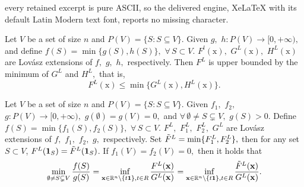 \documentclass[10pt,a4paper]{amsart}
\providecommand{\vx}{\ensuremath{\vec{x}}}
\renewcommand{\vec}[1]{\boldsymbol{\mathrm{#1}}}
\begin{document}
every retained excerpt is pure ASCII, so the delivered engine, XeLaTeX with its default Latin Modern text font, reports no missing character.
\begin{lemma}
\label{lem:min Lovasz}
Let $V$ be a set of size $n$ and $P(V) = \{S : S \subseteq V\}.$ Given $g,$ $h: P(V) \rightarrow [0, +\infty),$ and define $f(S) = \min\{g(S), h(S)\},$ $\forall \, S\subset V.$ $F^l(\vx),$ $G^L(\vx),$ $H^L(\vx)$ are Lov{\'a}sz extensions of $f,$ $g,$ $h,$ respectively. Then $F^L$ is upper bounded by the minimum of $G^L$ and $H^L,$ that is,
$$F^L(\vx) \leq \min\{G^L(\vx), H^L(\vx)\}.$$
\end{lemma}

\begin{theorem}\label{them:min frac lovasz}
Let $V$ be a set of size $n$ and $P(V) = \{S : S \subseteq V\}.$ Given $f_1,$ $f_2,$ $g: P(V) \rightarrow [0, +\infty),$ $g(\emptyset)=g(V)=0,$ and $\forall \, \emptyset \neq S \subsetneq V,$ $g(S)>0.$ Define $f(S) = \min\{f_1(S), f_2(S)\},$ $\forall \, S\subset V.$
$F^L,$ $F^L_1,$ $F^L_2,$ $G^L$ are Lov{\'a}sz extensions of $f,$ $f_1,$ $f_2,$ $g,$ respectively.
Set $\Tilde{F}^L = \min\{F_1^L, F_2^L\},$ then for any set $ S\subset V $, $ F^L(\mathbf{1}_S) = \Tilde{F}^L(\mathbf{1}_S) $.
If $f_1(V)=f_2(V)=0,$ then it holds that
$$\min_{\emptyset \neq S \subsetneq V} \frac{f(S)}{g(S)} = \inf_{\vx \in \mathbb{R}^n \backslash \{ t \vec 1\}, t \in R} \frac{F^L(\vx)}{G^L(\vx)}
 = \inf_{\vx \in \mathbb{R}^n \backslash \{ t \vec 1\}, t \in R} \frac{\Tilde{F}^L(\vx)}{G^L(\vx)}.$$
\end{theorem}
\end{document}

